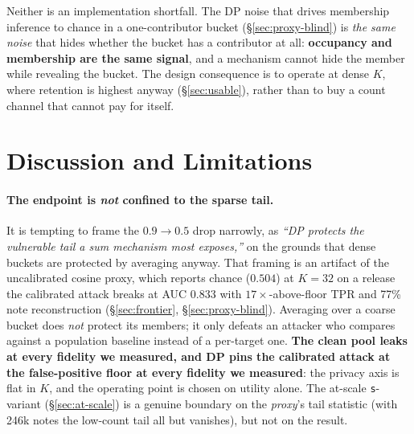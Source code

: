 \documentclass[pdflatex,sn-mathphys-num,12pt]{sn-jnl}
\theoremstyle{thmstyleone}%
\theoremstyle{thmstyletwo}%
\theoremstyle{thmstylethree}%
\newcommand{\secref}[1]{\S\ref{#1}}
\begin{document}
Neither is an implementation shortfall. The DP noise that drives membership inference to chance in
a one-contributor bucket (\secref{sec:proxy-blind}) is \emph{the same noise} that hides whether the
bucket has a contributor at all: \textbf{occupancy and membership are the same signal}, and a
mechanism cannot hide the member while revealing the bucket. The design consequence is to operate at
dense $K$, where retention is highest anyway (\secref{sec:usable}), rather than to buy a count
channel that cannot pay for itself.

\section{Discussion and Limitations}\label{sec:discussion}

\paragraph{The endpoint is \emph{not} confined to the sparse tail.} It is tempting to frame
the $0.9 \to 0.5$ drop narrowly, as \emph{``DP protects the vulnerable tail a sum mechanism
most exposes,''} on the grounds that dense buckets are protected by averaging anyway. That
framing is an artifact of the uncalibrated cosine proxy, which reports chance ($0.504$) at
$K = 32$ on a release the calibrated attack breaks at AUC $0.833$ with $17\times$-above-floor
TPR and 77\% note reconstruction (\secref{sec:frontier}, \secref{sec:proxy-blind}). Averaging
over a coarse bucket does \emph{not} protect its members; it only defeats an attacker who
compares against a population baseline instead of a per-target one. \textbf{The clean pool
leaks at every fidelity we measured, and DP pins the calibrated attack at the false-positive
floor at every fidelity we measured}: the privacy axis is flat in $K$, and the operating point
is chosen on utility alone. The at-scale \texttt{s}-variant (\secref{sec:at-scale}) is a genuine
boundary on the \emph{proxy}'s tail statistic (with 246k notes the low-count tail all but
vanishes), but not on the result.
\end{document}
